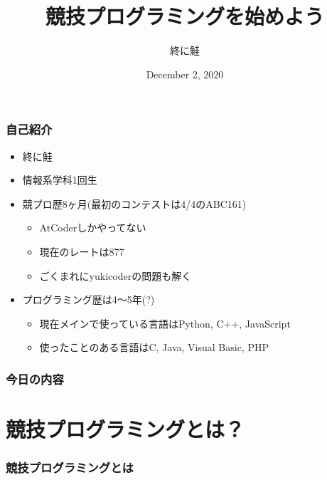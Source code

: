 \documentclass[t, aspectratio=169, dvipdfmx]{beamer}
\title[競プロ体験会]{競技プログラミングを始めよう}
\author{終に鮭}
\institute[OUCRC]{電子計算機研究会}
\date[12/2]{December 2, 2020}
\begin{document}
\frame{\titlepage}

\begin{frame}
  \frametitle{自己紹介}
  \begin{itemize}
    \item 終に鮭
    \item 情報系学科1回生
    \item 競プロ歴8ヶ月(最初のコンテストは4/4のABC161)
    \begin{itemize}
      \item AtCoderしかやってない
      \item 現在のレートは\textcolor{green!50!black}{877}
      \item ごくまれにyukicoderの問題も解く
    \end{itemize}
    \item プログラミング歴は4～5年(?)
    \begin{itemize}
      \item 現在メインで使っている言語はPython, C++, JavaScript
      \item 使ったことのある言語はC, Java, Visual Basic, PHP
    \end{itemize}
  \end{itemize}
\end{frame}

\begin{frame}
  \frametitle{今日の内容}
  \begin{multicols}{2}
    \tableofcontents
  \end{multicols}
\end{frame}

\section{競技プログラミングとは？}
\frame{\sectionpage}

\begin{frame}[c]
  \frametitle{競技プログラミングとは}
\end{frame}
\end{document}
